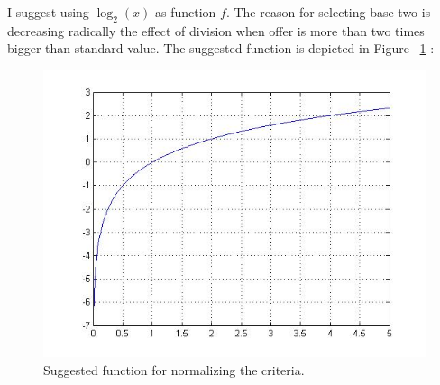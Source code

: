 I suggest using $\log _2 \left( x \right)$ as function $f$. The reason for selecting base two is decreasing radically the effect of division when offer is more than two times bigger than standard value. The suggested function is depicted in Figure ~\ref{fig:FUNC} :

\begin{figure}
  \centering
    \includegraphics[width=12cm]{diagram.jpg}
  \caption{Suggested function for normalizing the criteria.}
  \label{fig:FUNC}
\end{figure}
